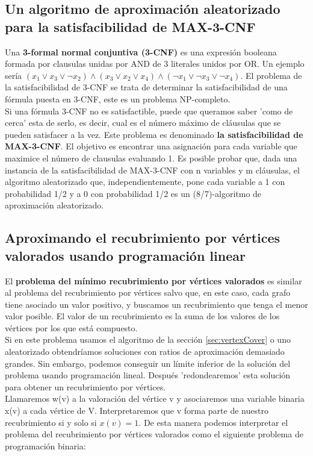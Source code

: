 \documentclass{article}
\begin{document}
\subsection{Un algoritmo de aproximación aleatorizado para la satisfacibilidad de MAX-3-CNF}
Una \textbf{3-formal normal conjuntiva (3-CNF)} es una expresión booleana formada por clausulas unidas por AND de 3 literales unidos por OR. Un ejemplo sería $(x_1 \vee x_3 \vee \neg x_2) \wedge (x_3 \vee x_2 \vee x_4) \wedge(\neg x_1 \vee \neg x_3 \vee \neg x_4)$. El problema de la satisfacibilidad de 3-CNF se trata de determinar la satisfacibilidad de una fórmula puesta en 3-CNF, este es un problema NP-completo.\\

Si una fórmula 3-CNF no es satisfactible, puede que queramos saber 'como de cerca' esta de serlo, es decir, cual es el número máximo de cláusulas que se pueden satisfacer a la vez. Este problema es denominado \textbf{la satisfacibilidad de MAX-3-CNF}. El objetivo es encontrar una asignación para cada variable que maximice el número de clausulas evaluando 1. Es posible probar que, dada una instancia de la satisfacibilidad de MAX-3-CNF con n variables y m cláusulas, el algoritmo aleatorizado que, independientemente, pone cada variable a 1 con probabilidad 1/2 y a 0 con probabilidad 1/2 es un (8/7)-algoritmo de aproximación aleatorizado.

\subsection{Aproximando el recubrimiento por vértices valorados usando programación linear}
El \textbf{problema del mínimo recubrimiento por vértices valorados} es similar al problema del recubrimiento por vértices salvo que, en este caso, cada grafo tiene asociado un valor positivo, y buscamos un recubrimiento que tenga el menor valor posible. El valor de un recubrimiento es la suma de los valores de los vértices por los que está compuesto.\\

Si en este problema usamos el algoritmo de la sección \ref{sec:vertexCover} o uno aleatorizado obtendríamos soluciones con ratios de aproximación demasiado grandes. Sin embargo, podemos conseguir un límite inferior de la solución del problema usando programación lineal. Después 'redondearemos' esta solución para obtener un recubrimiento por vértices.\\

Llamaremos w(v) a la valoración del vértice v y asociaremos una variable binaria x(v) a cada vértice de V. Interpretaremos que v forma parte de nuestro recubrimiento si y solo si $x(v) = 1$.  De esta manera podemos interpretar el problema del recubrimiento por vértices valorados como el siguiente problema de programación binaria:\\
\end{document}
